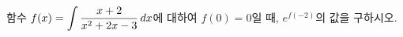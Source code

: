 함수 $f(x)=\displaystyle\int\dfrac{x+2}{x^2+2x-3}\mkern3mu dx$에 대하여 $f(0)=0$일 때, $e^{f(-2)}$의 값을 구하시오.
